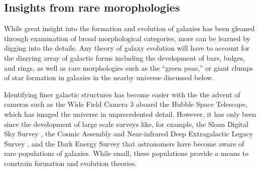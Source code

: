 


\subsection{Insights from rare morophologies}
While great insight into the formation and evolution of galaxies has been gleaned through examination of broad morphological categories, more can be learned by digging into the details. Any theory of galaxy evolution will have to account for the dizzying array of galactic forms including the development of bars, bulges, and rings, as well as rare morphologies such as the ``green peas,'' or giant clumps of star formation in galaxies in the nearby universe discussed below.

Identifying finer galactic structures has become easier with the the advent of cameras such as the Wide Field Camera 3 \citep{Dressel2012} aboard the Hubble Space Telescope, which has imaged the universe in unprecedented detail. However, it has only been since the development of large scale surveys like, for example, the Sloan Digital Sky Survey \citep[SDSS,][]{York2000,Abazajian2003}, the Cosmic Assembly and Near-infrared Deep Extragalactic Legacy Survey \citep[CANDELS,][]{Grogin2011,Koekemoer2011}, and the Dark Energy Survey \citep[DES,][]{DES2005} that astronomers have become aware of rare populations of galaxies. While small, these populations provide a means to constrain formation and evolution theories. 

